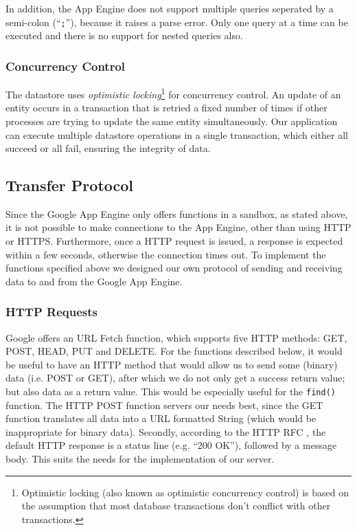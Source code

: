 In addition, the App Engine does not support multiple queries seperated by a
semi-colon (``\texttt{;}''), because it raises a parse error. Only one query at
a time can be executed and there is no support for nested queries also.

\subsubsection{Concurrency Control}
\label{serverdesign-transactions}
The datastore uses \emph{optimistic locking}\footnote{Optimistic locking (also
known as optimistic concurrency control) is based on the assumption that most
database transactions don't conflict with other transactions.} for concurrency
control. An update of an entity occurs in a transaction that is retried a fixed
number of times if other processes are trying to update the same entity
simultaneously. Our application can execute multiple datastore operations in a
single transaction, which either all succeed or all fail, ensuring the integrity
of data. 

\subsection{Transfer Protocol}
\label{serverdesign-transfer-protocol}
Since the Google App Engine only offers functions in a sandbox, as stated above,
it is not possible to make connections to the App Engine, other than using HTTP
or HTTPS. Furthermore, once a HTTP request is issued, a response is expected within
a few seconds, otherwise the connection times out. To implement the functions
specified above we designed our own protocol of sending and receiving data to
and from the Google App Engine.

\subsubsection{HTTP Requests}
Google offers an URL Fetch function, which supports five HTTP methods: GET, POST,
HEAD, PUT and DELETE. For the functions described below, it would be useful to
have an HTTP method that would allow us to send some (binary) data (i.e. POST or
GET), after which we do not only get a success return value; but also data as a
return value. This would be especially useful for the \texttt{find()} function.
The HTTP POST function servers our needs best, since the GET function translates
all data into a URL formatted String (which would be inappropriate for binary
data). Secondly, according to the HTTP RFC , the default HTTP response is a
status line (e.g. ``200 OK''), followed by a message body. This suits the needs
for the implementation of our server.

